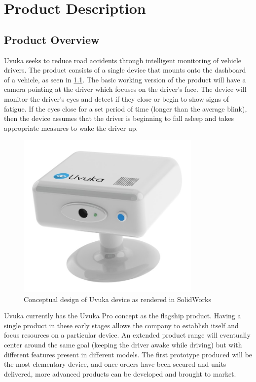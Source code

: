\newpage 
\chapter{Product Description}
\section{Product Overview}
Uvuka seeks to reduce road accidents through intelligent monitoring of vehicle drivers. The product consists of a single device that mounts onto the dashboard of a vehicle, as seen in \cref{fig:Uvuka_casing_concept}. The basic working version of the product will have a camera pointing at the driver which focuses on the driver's face. The device will monitor the driver's eyes and detect if they close or begin to show signs of fatigue. If the eyes close for a set period of time (longer than the average blink), then the device assumes that the driver is beginning to fall asleep and takes appropriate measures to wake the driver up.

\begin{figure}[H]
\centering
\includegraphics[width=0.8\textwidth]{images/Uvuka_casing_concept.JPG}
\vskip10pt
\caption{Conceptual design of Uvuka device as rendered in SolidWorks}
\label{fig:Uvuka_casing_concept}
\end{figure}

Uvuka currently has the Uvuka Pro concept as the flagship product. Having a single product in these early stages allows the company to establish itself and focus resources on a particular device. An extended product range will eventually center around the same goal (keeping the driver awake while driving) but with different features present in different models. The first prototype produced will be the most elementary device, and once orders have been secured and units delivered, more advanced products can be developed and brought to market.


